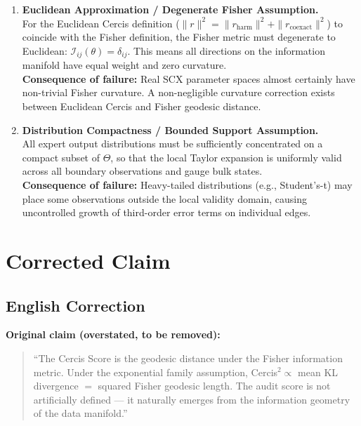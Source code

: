 \documentclass{article}
\newcommand{\Fisher}{\mathcal{I}}
\begin{document}
\begin{enumerate}[label=\textbf{H\arabic*:}, leftmargin=*, itemsep=0.8em]
    \item \textbf{Euclidean Approximation / Degenerate Fisher Assumption.} \\
    For the Euclidean Cercis definition ($\|r\|^2 = \|r_{\text{harm}}\|^2 + \|r_{\text{coexact}}\|^2$)
    to coincide with the Fisher definition, the Fisher metric must degenerate to Euclidean:
    $\Fisher_{ij}(\theta) = \delta_{ij}$. This means all directions on the information manifold
    have equal weight and zero curvature.
    \\[0.3em]
    \textbf{Consequence of failure:} Real SCX parameter spaces almost certainly have non-trivial
    Fisher curvature. A non-negligible curvature correction exists between Euclidean Cercis and
    Fisher geodesic distance.

    \item \textbf{Distribution Compactness / Bounded Support Assumption.} \\
    All expert output distributions must be sufficiently concentrated on a compact
    subset of $\Theta$, so that the local Taylor expansion is uniformly valid across all
    boundary observations and gauge bulk states.
    \\[0.3em]
    \textbf{Consequence of failure:} Heavy-tailed distributions (e.g., Student's-t) may place
    some observations outside the local validity domain, causing uncontrolled growth of
    third-order error terms on individual edges.
\end{enumerate}

\section{Corrected Claim}

\subsection{English Correction}

\textbf{Original claim (overstated, to be removed):}
\begin{quote}
``The Cercis Score is the geodesic distance under the Fisher information metric.
Under the exponential family assumption, Cercis${}^2 \propto$ mean KL divergence
$=$ squared Fisher geodesic length. The audit score is not artificially defined —
it naturally emerges from the information geometry of the data manifold.''
\end{quote}
\end{document}
